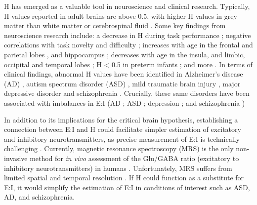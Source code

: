 \documentclass[
true
]{sn-jnl}
\begin{document}
H has emerged as a valuable tool in neuroscience and clinical research.
Typically, H values reported in adult brains are above 0.5, with higher
H values in grey matter than white matter or cerebrospinal fluid
\citep{dongHurstExponentAnalysis2018, winkMonofractalMultifractalDynamics2008}.
Some key findings from neuroscience research include: a decrease in H
during task performance
\citep{ciuciuInterplayFunctionalConnectivity2014, heScaleFreePropertiesFunctional2011};
negative correlations with task novelty and difficulty
\citep{churchillSuppressionScalefreeFMRI2016}; increases with age in the
frontal and parietal lobes \citep{dongHurstExponentAnalysis2018}, and
hippocampus \citep{winkAgeCholinergicEffects2006}; decreases with age in
the insula, and limbic, occipital and temporal lobes
\citep{dongHurstExponentAnalysis2018}; H \textless{} 0.5 in preterm
infants \citep{mellaTemporalComplexityBOLDsignal2024}; and more
\citep{campbellMonofractalAnalysisFunctional2022}. In terms of clinical
findings, abnormal H values have been identified in Alzheimer's disease
(AD)
\citep{maximFractionalGaussianNoise2005, warsiCorrelatingBrainBlood2012},
autism spectrum disorder (ASD)
\citep{donaTemporalFractalAnalysis2017, laiShiftRandomnessBrain2010, linkeAlteredDevelopmentHurst2024, uscatescuUsingExcitationInhibition2023},
mild traumatic brain injury \citep{donaFractalAnalysisBrain2017}, major
depressive disorder
\citep{weiIdentifyingMajorDepressive2013, jingIdentifyingCurrentRemitted2017}
and schizophrenia
\citep{sokunbiNonlinearComplexityAnalysis2014, uscatescuUsingExcitationInhibition2023}.
Crucially, these same disorders have been associated with imbalances in
E:I (AD
\citep{lauterbornIncreasedExcitatoryInhibitory2021, vicovarelaExcitatoryinhibitoryImbalanceAlzheimers2019};
ASD
\citep{sohalExcitationinhibitionBalanceFramework2019, uzunovaExcitatoryInhibitoryImbalance2016, bruiningMeasurementExcitationinhibitionRatio2020};
depression \citep{pagePrefrontalExcitatoryInhibitory2019}; and
schizophrenia \citep{kangInterplayMentalDisorder2019})

In addition to its implications for the critical brain hypothesis,
establishing a connection between E:I and H could facilitate simpler
estimation of excitatory and inhibitory neurotransmitters, as precise
measurement of E:I is technically challenging
\citep{ajramContribution1HMagnetic2019}. Currently, magnetic resonance
spectroscopy (MRS) is the only non-invasive method for \emph{in vivo}
assessment of the Glu/GABA ratio (excitatory to inhibitory
neurotransmitters) in humans
\citep{stanleyFunctionalMagneticResonance2018, harrisEdited1Magnetic2017}.
Unfortunately, MRS suffers from limited spatial and temporal resolution
\citep{gaoInferringSynapticExcitation2017, ajramContribution1HMagnetic2019, stanleyFunctionalMagneticResonance2018}.
If H could function as a substitute for E:I, it would simplify the
estimation of E:I in conditions of interest such as ASD, AD, and
schizophrenia.
\end{document}
